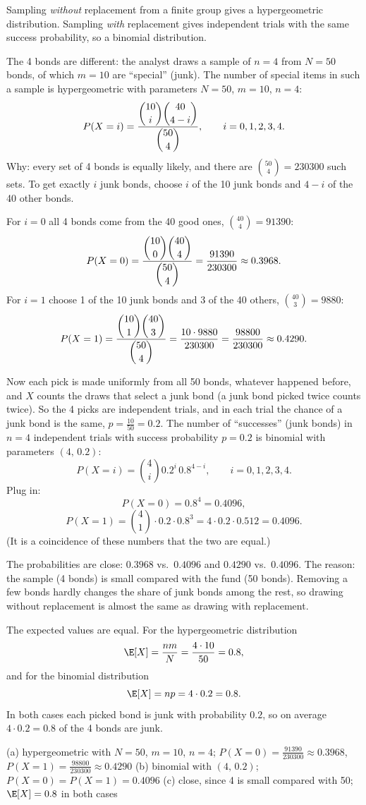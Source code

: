\begin{solution}
	\idea Sampling \emph{without} replacement from a finite group gives a
	hypergeometric distribution. Sampling \emph{with} replacement gives
	independent trials with the same success probability, so a binomial
	distribution.

	 The 4 bonds are different: the analyst draws a sample of $n=4$
	from $N=50$ bonds, of which $m=10$ are ``special'' (junk). The number of
	special items in such a sample is hypergeometric with parameters
	$N=50$, $m=10$, $n=4$:
	\[ P(X=i)=\frac{\dbinom{10}{i}\dbinom{40}{4-i}}{\dbinom{50}{4}},
		\qquad i=0,1,2,3,4. \]
	Why: every set of 4 bonds is equally likely, and there are
	$\binom{50}{4}=230300$ such sets. To get exactly $i$ junk bonds, choose
	$i$ of the 10 junk bonds and $4-i$ of the 40 other bonds.

	For $i=0$ all 4 bonds come from the 40 good ones, $\binom{40}{4}=91390$:
	\[ P(X=0)=\frac{\dbinom{10}{0}\dbinom{40}{4}}{\dbinom{50}{4}}
		=\frac{91390}{230300}\approx0.3968. \]
	For $i=1$ choose 1 of the 10 junk bonds and 3 of the 40 others,
	$\binom{40}{3}=9880$:
	\[ P(X=1)=\frac{\dbinom{10}{1}\dbinom{40}{3}}{\dbinom{50}{4}}
		=\frac{10\cdot9880}{230300}=\frac{98800}{230300}\approx0.4290. \]

	 Now each pick is made uniformly from all 50 bonds, whatever
	happened before, and $X$ counts the draws that select a junk bond (a junk
	bond picked twice counts twice). So the 4 picks are independent trials, and in each trial the
	chance of a junk bond is the same, $p=\frac{10}{50}=0.2$. The number of
	``successes'' (junk bonds) in $n=4$ independent trials with success
	probability $p=0.2$ is binomial with parameters $(4,\,0.2)$:
	\[ P(X=i)=\binom{4}{i}0.2^i\,0.8^{4-i},\qquad i=0,1,2,3,4. \]
	Plug in:
	\[ P(X=0)=0.8^4=0.4096, \]
	\[ P(X=1)=\binom41\cdot0.2\cdot0.8^3=4\cdot0.2\cdot0.512=0.4096. \]
	(It is a coincidence of these numbers that the two are equal.)

	 The probabilities are close: $0.3968$ vs.\ $0.4096$ and
	$0.4290$ vs.\ $0.4096$. The reason: the sample (4 bonds) is small
	compared with the fund (50 bonds). Removing a few bonds hardly changes
	the share of junk bonds among the rest, so drawing without replacement
	is almost the same as drawing with replacement.

	The expected values are equal. For the hypergeometric distribution
	\[ \E[X]=\frac{nm}{N}=\frac{4\cdot10}{50}=0.8, \]
	and for the binomial distribution
	\[ \E[X]=np=4\cdot0.2=0.8. \]
	In both cases each picked bond is junk with probability $0.2$, so on
	average $4\cdot0.2=0.8$ of the 4 bonds are junk.

	\begin{answer}
		(a) hypergeometric with $N=50$, $m=10$, $n=4$;
		$P(X=0)=\frac{91390}{230300}\approx0.3968$,
		$P(X=1)=\frac{98800}{230300}\approx0.4290$ \quad
		(b) binomial with $(4,\,0.2)$; $P(X=0)=P(X=1)=0.4096$ \quad
		(c) close, since 4 is small compared with 50; $\E[X]=0.8$ in both cases
	\end{answer}
\end{solution}
